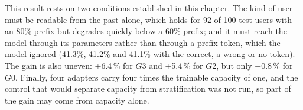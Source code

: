 This result rests on two conditions established in this chapter. The kind of user must be readable from the past alone, which holds for 92 of 100 test users with an 80\% prefix but degrades quickly below a 60\% prefix; and it must reach the model through its parameters rather than through a prefix token, which the model ignored (41.3\%, 41.2\% and 41.1\% with the correct, a wrong or no token). The gain is also uneven: +6.4\,\% for $G3$ and +5.4\,\% for $G2$, but only +0.8\,\% for $G0$. Finally, four adapters carry four times the trainable capacity of one, and the control that would separate capacity from stratification was not run, so part of the gain may come from capacity alone.
